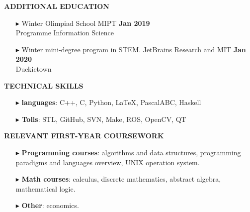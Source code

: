 \documentclass[a4paper,10pt]{article}
\begin{document}
	\colorbox{magicmint}{
		\begin{minipage}{0.96\textwidth}
			\textbf{ADDITIONAL EDUCATION}
		\end{minipage}
	}
	
	\begin{itemize}
		\item[$\blacktriangleright$]  Winter Olimpiad School MIPT \hspace{10.4cm}\textbf{Jan 2019} \\ Programme Information Science 
		\item[$\blacktriangleright$]  Winter mini-degree program in STEM. JetBrains Research and MIT \hspace{4.7cm}\textbf{Jan 2020} \\ Duckietown
	\end{itemize}
	
	\colorbox{magicmint}{
		\begin{minipage}{0.96\textwidth}
			\textbf{TECHNICAL SKILLS}
		\end{minipage}
	}
	\begin{itemize}
		\item [$\blacktriangleright$]  \textbf{languages}: C++, C, Python, \LaTeX, PascalABC, Haskell
		\item [$\blacktriangleright$]  \textbf{Tolls}: STL, GitHub, SVN, Make, ROS, OpenCV, QT
	\end{itemize}
	
	\colorbox{magicmint}{
		\begin{minipage}{0.96\textwidth}
			\textbf{RELEVANT FIRST-YEAR COURSEWORK}
		\end{minipage}
	}
	\begin{itemize}
		\item [$\blacktriangleright$]{
			\textbf{Programming courses}{: algorithms and data structures, programming paradigms and languages overview, UNIX operation system.}
		}
		\item [$\blacktriangleright$] {
			\textbf{Math courses}{: calculus, discrete mathematics, abstract algebra, mathematical logic.}
		}
		\item [$\blacktriangleright$] {
			\textbf{Other}{: economics.}
		}
	\end{itemize}
\end{document}
